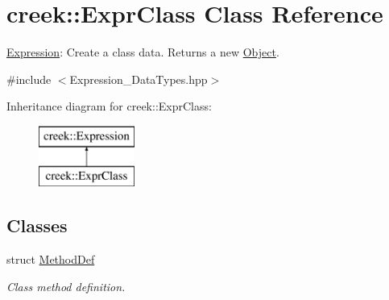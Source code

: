 \hypertarget{classcreek_1_1_expr_class}{}\section{creek\+:\+:Expr\+Class Class Reference}
\label{classcreek_1_1_expr_class}


\hyperlink{classcreek_1_1_expression}{Expression}\+: Create a class data. Returns a new {\ttfamily \hyperlink{classcreek_1_1_object}{Object}}.  




{\ttfamily \#include $<$Expression\+\_\+\+Data\+Types.\+hpp$>$}

Inheritance diagram for creek\+:\+:Expr\+Class\+:\begin{figure}[H]
\begin{center}
\leavevmode
\includegraphics[height=2.000000cm]{classcreek_1_1_expr_class}
\end{center}
\end{figure}
\subsection*{Classes}
\begin{DoxyCompactItemize}
\item 
struct \hyperlink{structcreek_1_1_expr_class_1_1_method_def}{Method\+Def}
\begin{DoxyCompactList}\small\item\em Class method definition. \end{DoxyCompactList}\end{DoxyCompactItemize}
